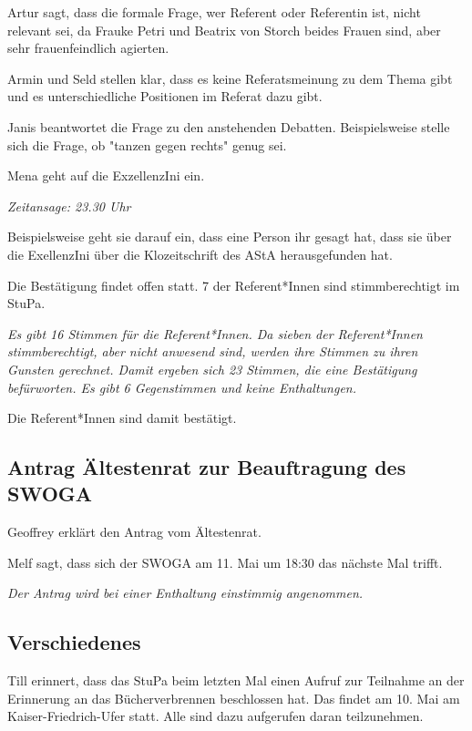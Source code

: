 \documentclass[ngerman,headheight=70pt]{scrartcl}
\begin{document}
    Artur sagt, dass die formale Frage, wer Referent oder Referentin ist,
    nicht relevant sei, da Frauke Petri und Beatrix von Storch beides Frauen sind,
    aber sehr frauenfeindlich agierten.

    Armin und Seld stellen klar, dass es keine Referatsmeinung zu dem
    Thema gibt und es unterschiedliche Positionen im Referat dazu gibt.

    Janis beantwortet die Frage zu den anstehenden Debatten. Beispielsweise
    stelle sich die Frage, ob "tanzen gegen rechts" genug sei.

    Mena geht auf die ExzellenzIni ein.

    \textit{Zeitansage: 23.30 Uhr}

    Beispielsweise geht sie darauf ein, dass eine Person ihr gesagt hat, dass
    sie über die ExellenzIni über die Klozeitschrift des AStA herausgefunden hat.

    Die Bestätigung findet offen statt. 7 der Referent*Innen sind stimmberechtigt
    im StuPa.

    \textit{Es gibt 16 Stimmen für die Referent*Innen. Da sieben der Referent*Innen
    stimmberechtigt, aber nicht anwesend sind, werden ihre Stimmen zu ihren
    Gunsten gerechnet. Damit ergeben sich 23 Stimmen, die eine Bestätigung
    befürworten. Es gibt 6 Gegenstimmen und keine Enthaltungen.}

    Die Referent*Innen sind damit bestätigt.

    \subsection{Antrag Ältestenrat zur Beauftragung des SWOGA}

    Geoffrey erklärt den Antrag vom Ältestenrat.

    Melf sagt, dass sich der SWOGA am 11. Mai um 18:30 das nächste Mal
    trifft.

    \textit{Der Antrag wird bei einer Enthaltung einstimmig angenommen.}

    \subsection{Verschiedenes}

    Till erinnert, dass das StuPa beim letzten Mal einen Aufruf zur Teilnahme
    an der Erinnerung an das Bücherverbrennen beschlossen hat. Das findet am
    10. Mai am Kaiser-Friedrich-Ufer statt. Alle sind dazu aufgerufen daran
    teilzunehmen.
\end{document}
